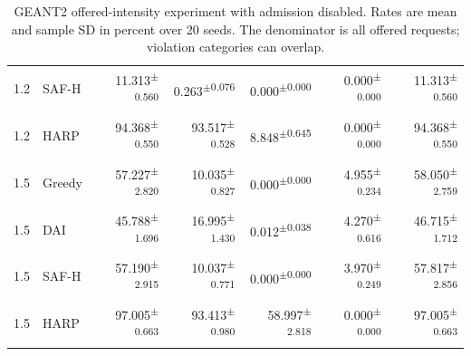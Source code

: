 \documentclass[final,5p]{elsarticle}
\begin{document}
\begin{table}[p]
\begin{tabular}{llrrrrr}
1.2 & SAF-H & 11.313\textsuperscript{$\pm$0.560} & 0.263\textsuperscript{$\pm$0.076} & 0.000\textsuperscript{$\pm$0.000} & 0.000\textsuperscript{$\pm$0.000} & 11.313\textsuperscript{$\pm$0.560} \\
1.2 & HARP & 94.368\textsuperscript{$\pm$0.550} & 93.517\textsuperscript{$\pm$0.528} & 8.848\textsuperscript{$\pm$0.645} & 0.000\textsuperscript{$\pm$0.000} & 94.368\textsuperscript{$\pm$0.550} \\
1.5 & Greedy & 57.227\textsuperscript{$\pm$2.820} & 10.035\textsuperscript{$\pm$0.827} & 0.000\textsuperscript{$\pm$0.000} & 4.955\textsuperscript{$\pm$0.234} & 58.050\textsuperscript{$\pm$2.759} \\
1.5 & DAI & 45.788\textsuperscript{$\pm$1.696} & 16.995\textsuperscript{$\pm$1.430} & 0.012\textsuperscript{$\pm$0.038} & 4.270\textsuperscript{$\pm$0.616} & 46.715\textsuperscript{$\pm$1.712} \\
1.5 & SAF-H & 57.190\textsuperscript{$\pm$2.915} & 10.037\textsuperscript{$\pm$0.771} & 0.000\textsuperscript{$\pm$0.000} & 3.970\textsuperscript{$\pm$0.249} & 57.817\textsuperscript{$\pm$2.856} \\
1.5 & HARP & 97.005\textsuperscript{$\pm$0.663} & 93.413\textsuperscript{$\pm$0.980} & 58.997\textsuperscript{$\pm$2.818} & 0.000\textsuperscript{$\pm$0.000} & 97.005\textsuperscript{$\pm$0.663} \\
\bottomrule
\end{tabular}
\caption{GEANT2 offered-intensity experiment with admission disabled. Rates are mean and sample SD in percent over 20 seeds. The denominator is all offered requests; violation categories can overlap.}
\label{tab:load_sweep_unprotected_geant2}
\end{table}
\end{document}
